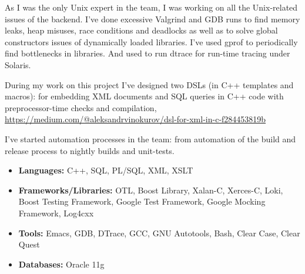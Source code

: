 As I was the only Unix expert in the team, I was working on all the
Unix-related issues of the backend. I've done excessive Valgrind and
GDB runs to find memory leaks, heap misuses, race conditions and
deadlocks as well as to solve global constructors issues of
dynamically loaded libraries.  I've used gprof to periodically find
bottlenecks in libraries. And used to run dtrace for run-time tracing
under Solaris.

During my work on this project I've designed two DSLs (in C++
templates and macros): for embedding XML documents and SQL queries in
C++ code with preprocessor-time checks and compilation,
\href{https://medium.com/@aleksandrvinokurov/dsl-for-xml-in-c-f284453819b}{https://medium.com/@aleksandrvinokurov/dsl-for-xml-in-c-f284453819b}

I've started automation processes in the team: from automation of the
build and release process to nightly builds and unit-tests.

\begin{itemize}[noitemsep, nosep]
  \item \textbf{Languages:} C++, SQL, PL/SQL, XML, XSLT
  \item \textbf{Frameworks/Libraries:} OTL, Boost Library, Xalan-C,
Xerces-C, Loki, Boost Testing Framework, Google Test Framework, Google
Mocking Framework, Log4cxx
  \item \textbf{Tools:} Emacs, GDB, DTrace, GCC, GNU Autotools, Bash,
Clear Case, Clear Quest
  \item \textbf{Databases:} Oracle 11g
\end{itemize}
